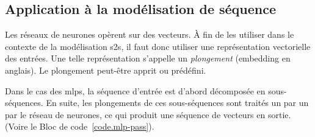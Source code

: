 \subsection{Application à la modélisation de séquence}

Les réseaux de neurones opèrent sur des vecteurs.
À fin de les utiliser dans le contexte de la modélisation \gls{s2s}, 
il faut donc utiliser une représentation vectorielle des entrées.
Une telle représentation s'appelle un \emph{plongement} (\foreignlanguage{english}{embedding} en anglais).
Le plongement peut-être apprit ou prédéfini.

Dans le cas des \glspl{mlp}, la séquence d'entrée est d'abord décomposée en sous-séquences.
En suite, les plongements de ces sous-séquences sont traités un par un par le réseau de neurones,
ce qui produit une séquence de vecteurs en sortie.
(Voire le Bloc de code~\ref{code.mlp-pass}).



